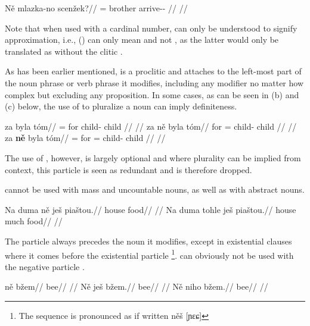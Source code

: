 \pex
\begingl
    \gla Ně mlazka-no scenžek?//
    \glb \Hon{}= brother arrive-\Av{}-\Pf{} //
    \glft {}//
\endgl
\xe

Note that when used with a cardinal number,  can only be understood to
signify approximation, i.e., () can only mean  and not , as the latter would only be
translated as  without the clitic .

As has been earlier mentioned,  is a proclitic and
attaches to the left-most part of the noun phrase or verb phrase it modifies,
including any modifier no matter how complex but excluding any proposition. In
some cases, as can be seen in (b) and (c) below, the use of  to
pluralize a noun can imply definiteness.

\pex
\a
\begingl{}
     za byla tóm//
    \glb \Pl{}= for child-\Acc{} child //
    \glft {}//
\endgl
\a
\begingl{}
    \gla za {ně} byla tóm//
    \glb for \Pl{}= child-\Acc{} child //
    \glft {}//
\endgl
\a
\begingl{}
     za \textbf{ně} byla tóm//
    \glb \Pl{}= for \Pl{}= child-\Acc{} child //
    \glft {}//
\endgl
\xe

The use of , however, is largely optional and where plurality can be
implied from context, this particle is seen as redundant and is therefore
dropped.

 cannot be used with mass and uncountable nouns, as well as with
abstract nouns.

\pex
\a
\begingl
\gla *Na duma ně ješ piaštou.//
\glb \Loc{} house \Pl{} \Exst{} food//
\glft {}//
\endgl
\a
\begingl
\gla Na duma tohle ješ piaštou.//
\glb \Loc{} house much \Exst{} food//
\glft {}//
\endgl
\xe

The particle  always precedes the noun it modifies, except in
existential clauses where it comes before the existential particle
\footnote{The sequence is pronounced as if written něš [ɲɛɕ]}.
 can obviously not be used with the negative particle
.

\pex
\a
\begingl
\gla ně bžem//
\glb \Pl{} bee//
\glft {}//
\endgl
\a
\begingl
\gla Ně ješ bžem.//
\glb \Pl{} \Exst{} bee//
\glft {}//
\endgl
\a
\begingl
\gla *Ně niho bžem.//
\glb \Pl{} \N{}\Exst{} bee//
\glft {}//
\endgl
\xe

